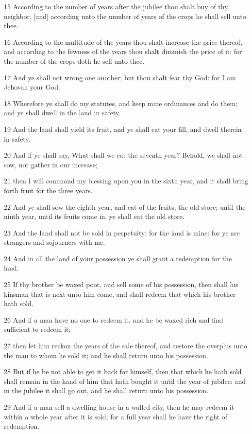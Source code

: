 \par 15 According to the number of years after the jubilee thou shalt buy of thy neighbor, [and] according unto the number of years of the crops he shall sell unto thee.
\par 16 According to the multitude of the years thou shalt increase the price thereof, and according to the fewness of the years thou shalt diminish the price of it; for the number of the crops doth he sell unto thee.
\par 17 And ye shall not wrong one another; but thou shalt fear thy God: for I am Jehovah your God.
\par 18 Wherefore ye shall do my statutes, and keep mine ordinances and do them; and ye shall dwell in the land in safety.
\par 19 And the land shall yield its fruit, and ye shall eat your fill, and dwell therein in safety.
\par 20 And if ye shall say, What shall we eat the seventh year? Behold, we shall not sow, nor gather in our increase;
\par 21 then I will command my blessing upon you in the sixth year, and it shall bring forth fruit for the three years.
\par 22 And ye shall sow the eighth year, and eat of the fruits, the old store; until the ninth year, until its fruits come in, ye shall eat the old store.
\par 23 And the land shall not be sold in perpetuity; for the land is mine: for ye are strangers and sojourners with me.
\par 24 And in all the land of your possession ye shall grant a redemption for the land.
\par 25 If thy brother be waxed poor, and sell some of his possession, then shall his kinsman that is next unto him come, and shall redeem that which his brother hath sold.
\par 26 And if a man have no one to redeem it, and he be waxed rich and find sufficient to redeem it;
\par 27 then let him reckon the years of the sale thereof, and restore the overplus unto the man to whom he sold it; and he shall return unto his possession.
\par 28 But if he be not able to get it back for himself, then that which he hath sold shall remain in the hand of him that hath bought it until the year of jubilee: and in the jubilee it shall go out, and he shall return unto his possession.
\par 29 And if a man sell a dwelling-house in a walled city, then he may redeem it within a whole year after it is sold; for a full year shall he have the right of redemption.
